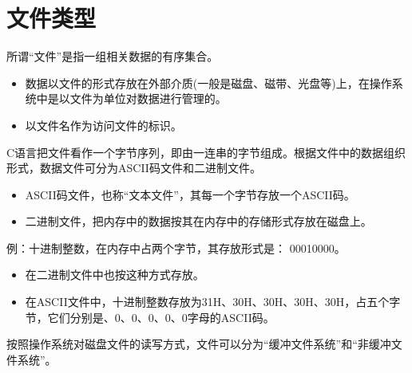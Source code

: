 \section{文件类型}

\begin{frame}[fragile]\ft{\secname}
所谓“文件”是指一组相关数据的有序集合。 \vspace{.05in}

\begin{itemize}
\item 数据以文件的形式存放在外部介质(一般是磁盘、磁带、光盘等)上，在操作系统中是以文件为单位对数据进行管理的。\\[0.1in]
\item 以文件名作为访问文件的标识。
\end{itemize}
\end{frame}

\begin{frame}[fragile]\ft{\secname}
C语言把文件看作一个字节序列，即由一连串的字节组成。根据文件中的数据组织形式，数据文件可分为ASCII码文件和二进制文件。\vspace{.05in}

  \begin{itemize}
  \item ASCII码文件，也称“文本文件”，其每一个字节存放一个ASCII码。\\[0.1in]
  \item 二进制文件，把内存中的数据按其在内存中的存储形式存放在磁盘上。
  \end{itemize}
\end{frame}

\begin{frame}[fragile]\ft{\secname}
例：十进制整数{}，在内存中占两个字节，其存放形式是：{ 00010000}。\vspace{.05in}

  \begin{itemize}
  \item 在二进制文件中也按这种方式存放。\\[0.1in]
  \item 在{\tf ASCII}文件中，十进制整数{}存放为{\tf 31H、30H、30H、30H、30H}，占五个字节，它们分别是{、0、0、0、0、0}字母的{\tf ASCII}码。
  \end{itemize}
\end{frame}

\begin{frame}[fragile]\ft{\secname}
按照操作系统对磁盘文件的读写方式，文件可以分为“缓冲文件系统”和“非缓冲文件系统”。
\end{frame}

